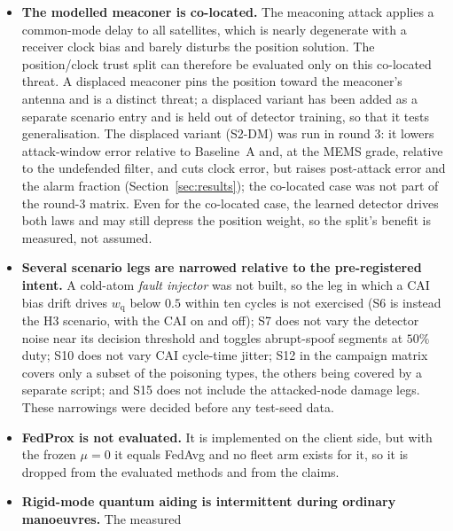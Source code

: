 \documentclass[journal]{IEEEtran}
\begin{document}
\begin{itemize}
  (modelled at the raw-observable level, not the signal or IF-sample level), the receiver oscillator, and the
  resulting sensor time series are all simulated. The simulated truth clock uses the same TCXO model as the
  filter, so the timing results are model-consistent by construction. No public dataset places a moving quantum
  inertial sensor under GNSS attack, so a fully real-data closed-loop evaluation is not currently possible, and
  receiver-internal (tracking-loop, correlator) effects are not captured.
\item \textbf{The modelled meaconer is co-located.} The meaconing attack applies a common-mode delay to all
  satellites, which is nearly degenerate with a receiver clock bias and barely disturbs the position solution.
  The position/clock trust split can therefore be evaluated only on this co-located threat. A displaced meaconer
  pins the position toward the meaconer's antenna and is a distinct threat; a displaced variant has been added
  as a separate scenario entry and is held out of detector training, so that it tests generalisation.
  The displaced variant (S2-DM) was run in round 3: it lowers attack-window error relative to Baseline~A and, at the MEMS grade, relative to the undefended filter, and cuts clock error, but raises post-attack error and the alarm fraction (Section~\ref{sec:results}); the co-located case was not part of the round-3 matrix. Even for the co-located case, the learned detector drives both laws
  and may still depress the position weight, so the split's benefit is measured, not assumed.
\item \textbf{Several scenario legs are narrowed relative to the pre-registered intent.} A cold-atom
  \emph{fault injector} was not built, so the leg in which a CAI bias drift drives $w_{\mathrm{q}}$ below $0.5$
  within ten cycles is not exercised (S6 is instead the H3 scenario, with the CAI on and off); S7 does not vary the
  detector noise near its decision threshold and toggles abrupt-spoof segments at $50\%$ duty; S10 does not
  vary CAI cycle-time jitter; S12 in the campaign matrix covers only a subset of the poisoning types, the others
  being covered by a separate script; and S15 does not include the attacked-node damage legs. These narrowings
  were decided before any test-seed data.
\item \textbf{FedProx is not evaluated.} It is implemented on the client side, but with the frozen $\mu = 0$ it
  equals FedAvg and no fleet arm exists for it, so it is dropped from the evaluated methods and from the claims.
\item \textbf{Rigid-mode quantum aiding is intermittent during ordinary manoeuvres.} The measured

\end{itemize}
\end{document}
